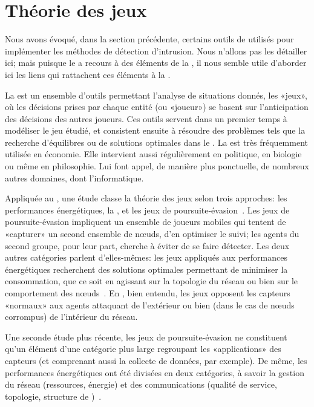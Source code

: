 \section{Théorie des jeux}

Nous avons évoqué, dans la section précédente, certains outils de  utilisés pour implémenter les méthodes de détection d'intrusion.
Nous n'allons pas les détailler ici; mais puisque le  a recours à des éléments de la , il nous semble utile d'aborder ici les liens qui rattachent ces éléments à la \secu.

La  est un ensemble d'outils permettant l'analyse de situations donnés, les «jeux», où les décisions prises par chaque entité (ou «joueur») se basent sur l'anticipation des décisions des autres joueurs.
Ces outils servent dans un premier temps à modéliser le jeu étudié, et consistent ensuite à résoudre des problèmes tels que la recherche d'équilibres ou de solutions optimales dans le .
La  est très fréquemment utilisée en économie.
Elle intervient aussi régulièrement en politique, en biologie ou même en philosophie.
Lui font appel, de manière plus ponctuelle, de nombreux autres domaines, dont l'informatique.

Appliquée au \rcsfs, une étude classe la théorie des jeux selon trois approches: les performances énergétiques, la \secu, et les jeux de poursuite-évasion~\cite{MT08}.
Les jeux de poursuite-évasion impliquent un ensemble de joueurs mobiles qui tentent de «capturer» un second ensemble de nœuds, d'en optimiser le suivi; les agents du second groupe, pour leur part, cherche à éviter de se faire détecter.
Les deux autres catégories parlent d'elles-mêmes: les jeux appliqués aux performances énergétiques recherchent des solutions optimales permettant de minimiser la consommation, que ce soit en agissant sur la topologie du réseau ou bien sur le comportement des nœuds~\cite{CPF09}.
En \secu, bien entendu, les jeux opposent les capteurs «normaux» aux agents attaquant de l'extérieur ou bien (dans le cas de nœuds corrompus) de l'intérieur du réseau.

Une seconde étude plus récente, les jeux de poursuite-évasion ne constituent qu'un élément d'une catégorie plus large regroupant les «applications» des capteurs (et comprenant aussi la collecte de données, par exemple).
De même, les performances énergétiques ont été divisées en deux catégories, à savoir la gestion du réseau (ressources, énergie) et des communications (qualité de service, topologie, structure de )~\cite{SWKC12}.

